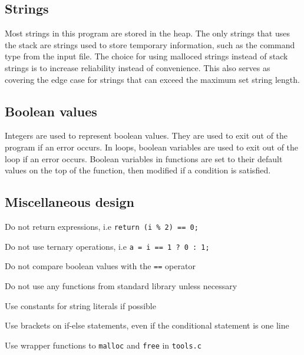 \documentclass[a4paper, 12pt, titlepage]{article}
\newcommand{\code}[1]{\small\texttt{#1}\normalsize}
\begin{document}
\subsection{Strings}

Most strings in this program are stored in the heap. The only strings 
that uses the stack are strings used to store temporary information, 
such as the command type from the input file. The choice for using 
malloced strings instead of stack strings is to increase reliability 
instead of convenience. This also serves as covering the edge case 
for strings that can exceed the maximum set string length.

\subsection{Boolean values}

Integers are used to represent boolean values. They are used to exit 
out of the program if an error occurs. In loops, boolean variables are 
used to exit out of the loop if an error occurs. Boolean variables in 
functions are set to their default values on the top of the function, then 
modified if a condition is satisfied.

\subsection{Miscellaneous design}

\begin{itemize}[label={--}]
\begin{samepage}
    \item Do not return expressions, i.e \code{return (i \% 2) == 0;}
    \item Do not use ternary operations, i.e \code{a = i == 1 ? 0 : 1;}
    \item Do not compare boolean values with the \code{==} operator
    \item Do not use any functions from standard library unless necessary
    \item Use constants for string literals if possible
    \item Use brackets on if-else statements, even if the conditional 
          statement is one line
    \item Use wrapper functions to \code{malloc} and \code{free} in 
          \code{tools.c}
\end{samepage}
\end{itemize}

\newpage
\end{document}
